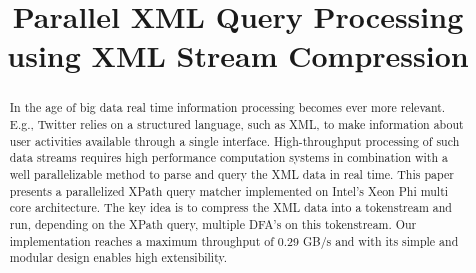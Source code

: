 \documentclass[letterpaper]{article}
\title{Parallel XML Query Processing using XML Stream Compression}
\begin{document}
%
\maketitle
%

\begin{abstract}
In the age of big data real time information processing becomes ever more
relevant. E.g., Twitter relies on a structured language, such as XML, to make
information about user activities available through a single interface.
High-throughput processing of such data streams requires high performance
computation systems in combination with a well parallelizable method to parse
and query the XML data in real time. This paper presents a parallelized XPath
query matcher implemented on Intel's Xeon Phi multi core architecture. The key
idea is to compress the XML data into a tokenstream and run, depending on the
XPath query, multiple DFA's on this tokenstream. Our implementation reaches a
maximum throughput of 0.29 GB/s and with its simple and modular design enables
high extensibility.
\end{abstract}
















\end{document}
